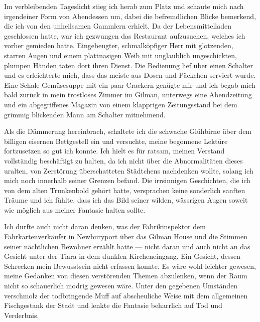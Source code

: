 Im verbleibenden Tageslicht stieg ich herab zum Platz und schaute mich nach irgendeiner Form von Abendessen um, dabei die befremdlichen Blicke bemerkend, die ich von den unheilsamen Gammlern erhielt. Da der Lebensmittelladen geschlossen hatte, war ich gezwungen das Restaurant aufzusuchen, welches ich vorher gemieden hatte. Eingebeugter, schmalköpfiger Herr mit glotzenden, starren Augen und einem plattnasigen Weib mit unglaublich ungeschickten, plumpen Händen taten dort ihren Dienst. Die Bedienung lief über einen Schalter und es erleichterte mich, dass das meiste aus Dosen und Päckchen serviert wurde. Eine Schale Gemüsesuppe mit ein paar Crackern genügte mir und ich begab mich bald zurück in mein trostloses Zimmer im Gilman, unterwegs eine Abendzeitung und ein abgegriffenes Magazin von einem klapprigen Zeitungsstand bei dem grimmig blickenden Mann am Schalter mitnehmend.

Als die Dämmerung hereinbrach, schaltete ich die schwache Glühbirne über dem billigen eisernen Bettgestell ein und versuchte, meine begonnene Lektüre fortzusetzen so gut ich konnte. Ich hielt es für ratsam, meinen Verstand vollständig beschäftigt zu halten, da ich nicht über die Abnormalitäten dieses uralten, von Zerstörung überschatteten Städtchens nachdenken wollte, solang ich mich noch innerhalb seiner Grenzen befand. Die irrsinnigen Geschichten, die ich von dem alten Trunkenbold gehört hatte, versprachen keine sonderlich sanften Träume und ich fühlte, dass ich das Bild seiner wilden, wässrigen Augen soweit wie möglich aus meiner Fantasie halten sollte.

Ich durfte auch nicht daran denken, was der Fabrikinspektor dem Fahrkartenverkäufer in Newburyport über das Gilman House und die Stimmen seiner nächtlichen Bewohner erzählt hatte --- nicht daran und auch nicht an das Gesicht unter der Tiara in dem dunklen Kircheneingang. Ein Gesicht, dessen Schrecken mein Bewusstsein nicht erfassen konnte. Es wäre wohl leichter gewesen, meine Gedanken von diesen verstörenden Themen abzulenken, wenn der Raum nicht so schauerlich modrig gewesen wäre. Unter den gegebenen Umständen verschmolz der todbringende Muff auf abscheuliche Weise mit dem allgemeinen Fischgestank der Stadt und lenkte die Fantasie beharrlich auf Tod und Verderbnis.

